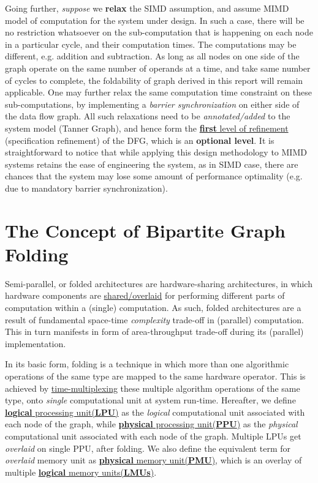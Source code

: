 \documentclass[12pt]{article}
\begin{document}
Going further, \textit{suppose} we \textbf{relax} the SIMD
assumption, and assume MIMD model of computation for the system under
design. In such a case, there will be no restriction whatsoever on the
sub-computation that is happening on each node in a particular
cycle, and their computation times. The
computations may be different, e.g.  addition and subtraction. As long as
all nodes on one side of the graph operate on the same number of operands
at a time, and take same number of cycles to complete, the foldability of
graph derived in this report will remain applicable. One may further relax
the same computation time constraint on these sub-computations, by
implementing a \textit{barrier synchronization} on either side of the data
flow graph. All such relaxations need to be \textit{annotated/added} to the
system model (Tanner Graph), and hence form the \uline{\textbf{first}
level of refinement} (specification refinement) of the DFG, which is an
\textbf{optional level}. It is straightforward to notice that while
applying this design methodology to MIMD systems retains the ease of
engineering the system, as in SIMD case, there are chances that the system
may lose some amount of performance optimality (e.g. due to mandatory
barrier synchronization).

\section{The Concept of Bipartite Graph Folding}
\label{fold_conc_sec}
Semi-parallel, or folded architectures are hardware-sharing architectures,
in which hardware components are \uline{shared/overlaid} for performing
different parts of computation within a (single) computation. As such,
folded architectures are a result of fundamental space-time 
\textit{complexity} trade-off in (parallel) computation. This in turn
manifests in form of area-throughput trade-off during its (parallel)
implementation.

In its basic
form, folding is a technique in which more than one algorithmic operations
of the same type are mapped to the same hardware operator. This is achieved
by \uline{time-multiplexing} these multiple algorithm operations of the
same type, onto \textit{single} computational unit at system run-time.
Hereafter, we define \uline{\textbf{logical} processing unit(\textbf{LPU})} as the
\textit{logical} computational unit associated with each node of the graph,
while \uline{\textbf{physical} processing unit(\textbf{PPU})} as the
\textit{physical} computational unit associated with each node of the graph.
Multiple LPUs get \textit{overlaid} on single PPU, after
folding. We also define the equivalent term for \textit{overlaid}
memory unit as \uline{\textbf{physical} memory unit(\textbf{PMU})}, which
is an overlay of multiple \uline{\textbf{logical} memory units(\textbf{LMUs})}.
\end{document}
